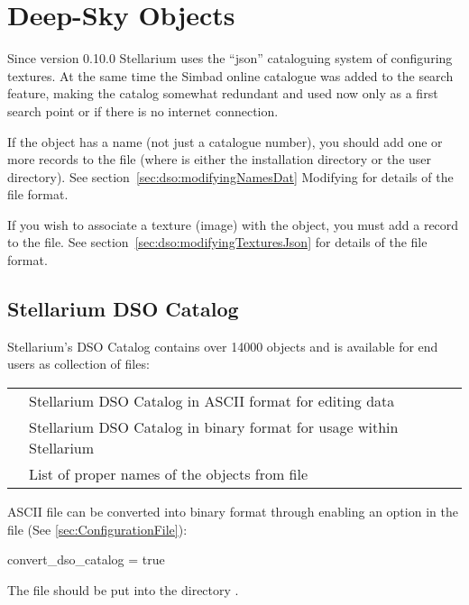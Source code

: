 
\chapter{Deep-Sky Objects}
\label{ch:DSO}


Since version 0.10.0 Stellarium uses the ``json'' cataloguing system
of configuring textures. At the same time the Simbad online catalogue
was added to the search feature, making the catalog somewhat redundant
and used now only as a first search point or if there is no internet
connection.

If the object has a name (not just a catalogue number), you should add
one or more records to the  file
(where  is either the installation directory or the user
directory). See section~\ref{sec:dso:modifyingNamesDat} Modifying 
for details of the file format.

If you wish to associate a texture (image) with the object, you must 
add a record to the  file. See
section~\ref{sec:dso:modifyingTexturesJson} for details of the file format.


\section{Stellarium DSO Catalog}
\label{sec:dso:catalog}

Stellarium's DSO Catalog contains over 14000 objects and is available
for end users as collection of files:

\begin{longtabu} to \textwidth {lX}
 &Stellarium DSO Catalog in ASCII format for editing data\\
 &Stellarium DSO Catalog in binary format for usage within Stellarium\\
   &List of proper names of the objects from file 
\end{longtabu}

ASCII file can be converted into binary format through enabling an option in the file  (See \ref{sec:ConfigurationFile}):
\begin{configfile}
[devel]
convert_dso_catalog = true
\end{configfile}

The file  should be put into the directory
.


